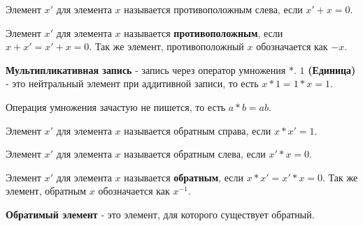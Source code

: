 Элемент $x'$ для элемента $x$ называется противоположным слева, если $x' + x = 0$.

Элемент $x'$ для элемента $x$ называется \textbf{противоположным}, если $x + x' = x' + x = 0$. Так же элемент, противоположный $x$ обозначается как $-x$.


\textbf{Мультипликативная запись} - запись через оператор умножения $\mathbf{*}$. $1$ \textbf{(Единица)} - это нейтральный элемент при аддитивной записи, то есть $x * 1 = 1 * x = 1$. 

Операция умножения зачастую не пишется, то есть $a * b = ab$.

Элемент $x'$ для элемента $x$ называется обратным справа, если $x * x' = 1$.

Элемент $x'$ для элемента $x$ называется обратным слева, если $x' * x = 0$.

Элемент $x'$ для элемента $x$ называется \textbf{обратным}, если $x * x' = x' * x = 0$. Так же элемент, обратным $x$ обозначается как $x^{-1}$.

\textbf{Обратимый элемент} - это элемент, для которого существует обратный.
















